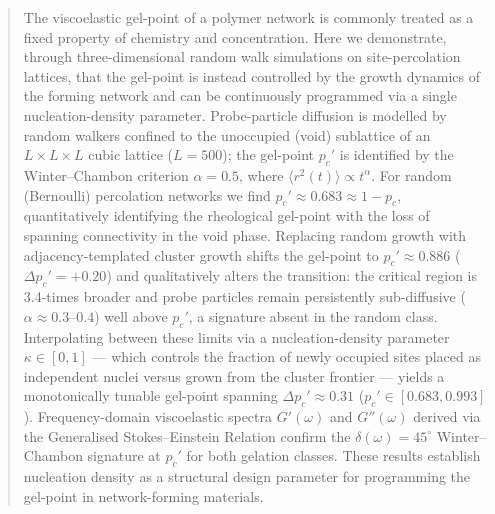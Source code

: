 \begin{abstract}
The viscoelastic gel-point of a polymer network is commonly treated as a fixed property of chemistry and concentration. Here we demonstrate, through three-dimensional random walk simulations on site-percolation lattices, that the gel-point is instead controlled by the growth dynamics of the forming network and can be continuously programmed via a single nucleation-density parameter. Probe-particle diffusion is modelled by random walkers confined to the unoccupied (void) sublattice of an $L \times L \times L$ cubic lattice ($L = 500$); the gel-point $p_c'$ is identified by the Winter--Chambon criterion $\alpha = 0.5$, where $\langle r^2(t) \rangle \propto t^\alpha$. For random (Bernoulli) percolation networks we find $p_c' \approx 0.683 \approx 1 - p_c$, quantitatively identifying the rheological gel-point with the loss of spanning connectivity in the void phase. Replacing random growth with adjacency-templated cluster growth shifts the gel-point to $p_c' \approx 0.886$ ($\Delta p_c' = +0.20$) and qualitatively alters the transition: the critical region is 3.4-times broader and probe particles remain persistently sub-diffusive ($\alpha \approx 0.3$--$0.4$) well above $p_c'$, a signature absent in the random class. Interpolating between these limits via a nucleation-density parameter $\kappa \in [0,1]$ — which controls the fraction of newly occupied sites placed as independent nuclei versus grown from the cluster frontier — yields a monotonically tunable gel-point spanning $\Delta p_c' \approx 0.31$ ($p_c' \in [0.683, 0.993]$). Frequency-domain viscoelastic spectra $G'(\omega)$ and $G''(\omega)$ derived via the Generalised Stokes--Einstein Relation confirm the $\delta(\omega) = 45^{\circ}$ Winter--Chambon signature at $p_c'$ for both gelation classes. These results establish nucleation density as a structural design parameter for programming the gel-point in network-forming materials.
\end{abstract}
